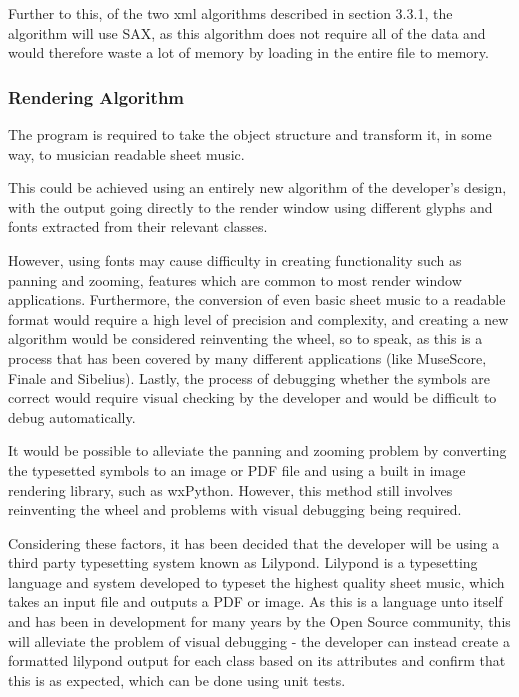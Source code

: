 Further to this, of the two xml algorithms described in section 3.3.1, the algorithm will use SAX, as this algorithm does not require all of the data and would therefore waste a lot of memory by loading in the entire file to memory.

\subsubsection{Rendering Algorithm}
The program is required to take the object structure and transform it, in some way, to musician readable sheet music. 

This could be achieved using an entirely new algorithm of the developer's design, with the output going directly to the render window using different glyphs and fonts extracted from their relevant classes.

However, using fonts may cause difficulty in creating functionality such as panning and zooming, features which are common to most render window applications. Furthermore, the conversion of even basic sheet music to a readable format would require a high level of precision and complexity, and creating a new algorithm would be considered reinventing the wheel, so to speak, as this is a process that has been covered by many different applications (like MuseScore\parencite{MuseTour}, Finale\parencite{mxml} and Sibelius\parencite{avid}). 
Lastly, the process of debugging whether the symbols are correct would require visual checking by the developer and would be difficult to debug automatically.

It would be possible to alleviate the panning and zooming problem by converting the typesetted symbols to an image or PDF file and using a built in image rendering library, such as wxPython\parencite{WX}. However, this method still involves reinventing the wheel and problems with visual debugging being required.

Considering these factors, it has been decided that the developer will be using a third party typesetting system known as Lilypond. Lilypond is a typesetting language and system developed to typeset the highest quality sheet music\parencite{Lilypond}, which takes an input file and outputs a PDF or image. As this is a language unto itself and has been in development for many years by the Open Source community, this will alleviate the problem of visual debugging - the developer can instead create a formatted lilypond output for each class based on its attributes and confirm that this is as expected, which can be done using unit tests.


